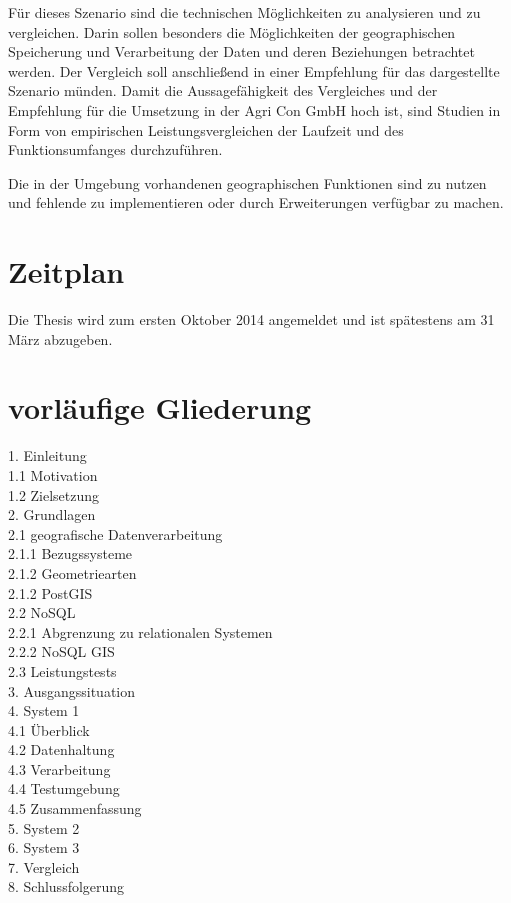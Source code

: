 \documentclass[
a4paper,     %
12pt         %
]{scrartcl}  %
\begin{document}
Für dieses Szenario sind die technischen Möglichkeiten zu analysieren und zu vergleichen.
Darin sollen besonders die Möglichkeiten der geographischen Speicherung und Verarbeitung der Daten und deren Beziehungen betrachtet werden.
Der Vergleich soll anschließend in einer Empfehlung für das dargestellte Szenario münden.
Damit die Aussagefähigkeit des Vergleiches und der Empfehlung für die Umsetzung in der Agri Con GmbH hoch ist, sind Studien in Form von empirischen Leistungsvergleichen der Laufzeit und des Funktionsumfanges durchzuführen.

Die in der Umgebung vorhandenen geographischen Funktionen sind zu nutzen und fehlende zu implementieren oder durch Erweiterungen verfügbar zu machen.


\section{Zeitplan}

Die Thesis wird zum ersten Oktober 2014 angemeldet und ist spätestens am 31 März abzugeben.





\section{vorläufige Gliederung}

1. Einleitung\\
1.1 Motivation\\
1.2 Zielsetzung\\
2. Grundlagen\\
2.1 geografische Datenverarbeitung\\
2.1.1 Bezugssysteme\\
2.1.2 Geometriearten\\
2.1.2 PostGIS\\
2.2 NoSQL\\
2.2.1 Abgrenzung zu relationalen Systemen\\
2.2.2 NoSQL GIS\\
2.3 Leistungstests\\
3. Ausgangssituation\\
4. System 1\\
4.1 Überblick\\
4.2 Datenhaltung\\
4.3 Verarbeitung\\
4.4 Testumgebung\\
4.5 Zusammenfassung\\
5. System 2\\
6. System 3\\
7. Vergleich\\
8. Schlussfolgerung\\
\end{document}
